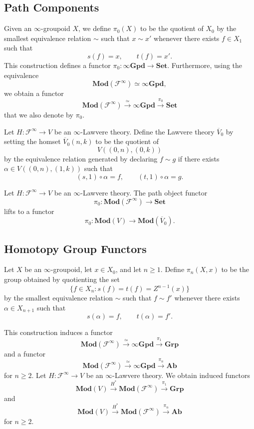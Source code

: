 \documentclass{tac}
\begin{document}
\subsection*{Path Components}
Given an $\infty$-groupoid $X$, we define $\pi_0(X)$ to be the quotient of $X_0$ by the smallest equivalence relation $\sim$ such that $x\sim x'$ whenever there exists $f\in X_1$ such that
\[
s(f)=x,\qquad t(f)=x'.
\]
This construction defines a functor $\pi_0:\infty\mathbf{Gpd}\to\mathbf{Set}$. Furthermore, using the equivalence
\[
\mathbf{Mod}(\mathcal{F}^\infty)\simeq\infty\mathbf{Gpd},
\]
we obtain a functor 
\[
\mathbf{Mod}(\mathcal{F}^\infty)\xrightarrow{\simeq}\infty\mathbf{Gpd}\xrightarrow{\pi_0}\mathbf{Set}
\]
that we also denote by $\pi_0$.

Let $H:\mathcal{F}^\infty\to V$ be an $\infty$-Lawvere theory. Define the Lawvere theory $\overline{V}_0$ by setting the homset $\overline{V}_0(n,k)$ to be the quotient of
\[
V((0,n),(0,k))
\]
by the equivalence relation generated by declaring $f\sim g$ if there exists $\alpha\in V((0,n),(1,k))$ such that
\[
(s,1)\circ\alpha=f,\qquad (t,1)\circ\alpha=g.
\]

\begin{lemma}
Let $H:\mathcal{F}^\infty\to V$ be an $\infty$-Lawvere theory. The path object functor
\[
\pi_0:\mathbf{Mod}(\mathcal{F}^\infty)\to\mathbf{Set}
\]
lifts to a functor
\[
\pi_0:\mathbf{Mod}(V)\to\mathbf{Mod}(\overline{V}_0).
\]
\end{lemma}


\subsection*{Homotopy Group Functors}

Let $X$ be an $\infty$-groupoid, let $x\in X_0$, and let $n\geq 1$. Define $\pi_n(X,x)$ to be the group obtained by quotienting the set
\[
\{f\in X_n:s(f)=t(f)=Z^{n-1}(x)\}
\]
by the smallest equivalence relation $\sim$ such that $f\sim f'$ whenever there exists $\alpha\in X_{n+1}$ such that
\[
s(\alpha)=f,\qquad t(\alpha)=f'.
\]

This construction induces a functor
\[
\mathbf{Mod}(\mathcal{F}^\infty)\xrightarrow{\simeq}\infty\mathbf{Gpd}\xrightarrow{\pi_1}\mathbf{Grp}
\]
and a functor
\[
\mathbf{Mod}(\mathcal{F}^\infty)\xrightarrow{\simeq}\infty\mathbf{Gpd}\xrightarrow{\pi_n}\mathbf{Ab}
\]
for $n\geq 2$. Let $H:\mathcal{F}^\infty\to V$ be an $\infty$-Lawvere theory. We obtain induced functors
\[
\mathbf{Mod}(V)\xrightarrow{H^*}\mathbf{Mod}(\mathcal{F}^\infty)\xrightarrow{\pi_1}\mathbf{Grp}
\]
and
\[
\mathbf{Mod}(V)\xrightarrow{H^*}\mathbf{Mod}(\mathcal{F}^\infty)\xrightarrow{\pi_n}\mathbf{Ab}
\]
for $n\geq 2$.
\end{document}
